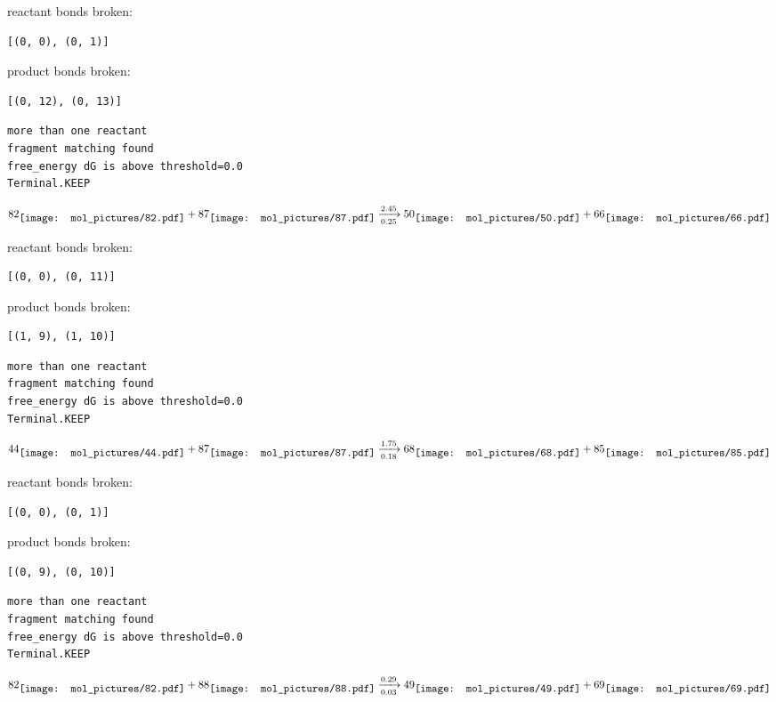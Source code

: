 \documentclass{article}
\begin{document}
reactant bonds broken:\begin{verbatim}
[(0, 0), (0, 1)]
\end{verbatim}
product bonds broken:\begin{verbatim}
[(0, 12), (0, 13)]
\end{verbatim}




\vspace{1cm}
\begin{verbatim}
more than one reactant
fragment matching found
free_energy dG is above threshold=0.0
Terminal.KEEP
\end{verbatim}
$$
82
\raisebox{-.5\height}{\texttt{[image: mol\_pictures/82.pdf]}}
+
87
\raisebox{-.5\height}{\texttt{[image: mol\_pictures/87.pdf]}}
\xrightarrow[0.25]{2.45}
50
\raisebox{-.5\height}{\texttt{[image: mol\_pictures/50.pdf]}}
+
66
\raisebox{-.5\height}{\texttt{[image: mol\_pictures/66.pdf]}}
$$


reactant bonds broken:\begin{verbatim}
[(0, 0), (0, 11)]
\end{verbatim}
product bonds broken:\begin{verbatim}
[(1, 9), (1, 10)]
\end{verbatim}




\vspace{1cm}
\begin{verbatim}
more than one reactant
fragment matching found
free_energy dG is above threshold=0.0
Terminal.KEEP
\end{verbatim}
$$
44
\raisebox{-.5\height}{\texttt{[image: mol\_pictures/44.pdf]}}
+
87
\raisebox{-.5\height}{\texttt{[image: mol\_pictures/87.pdf]}}
\xrightarrow[0.18]{1.75}
68
\raisebox{-.5\height}{\texttt{[image: mol\_pictures/68.pdf]}}
+
85
\raisebox{-.5\height}{\texttt{[image: mol\_pictures/85.pdf]}}
$$


reactant bonds broken:\begin{verbatim}
[(0, 0), (0, 1)]
\end{verbatim}
product bonds broken:\begin{verbatim}
[(0, 9), (0, 10)]
\end{verbatim}




\vspace{1cm}
\begin{verbatim}
more than one reactant
fragment matching found
free_energy dG is above threshold=0.0
Terminal.KEEP
\end{verbatim}
$$
82
\raisebox{-.5\height}{\texttt{[image: mol\_pictures/82.pdf]}}
+
88
\raisebox{-.5\height}{\texttt{[image: mol\_pictures/88.pdf]}}
\xrightarrow[0.03]{0.29}
49
\raisebox{-.5\height}{\texttt{[image: mol\_pictures/49.pdf]}}
+
69
\raisebox{-.5\height}{\texttt{[image: mol\_pictures/69.pdf]}}
$$
\end{document}

